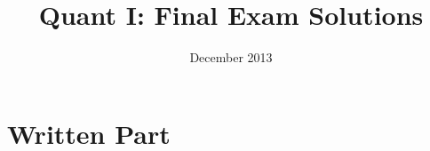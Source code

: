 \documentclass[12pt]{article}
\begin{document}
\def\sumi{\sum_{i=1}^N}
\def\yi{y_i}
\def\ybar{\bar{y}}
\def\xbar{\bar{x}}
\def\Ybar{\bar{Y}}
\def\Xbar{\bar{X}}
\def\eqc{&=&}
\def\thhat{\hat{\theta}}
\def\muhat{\hat{\mu}}
\def\expct{\mathbb{E}}
\def\hpl{\hat{p}_L}
\def\hpi{\hat{p}_I}
\def\hb0{\hat{\beta}_0}
\def\hb1{\hat{\beta}_1}
\def\sigx{\sigma_X}
\def\sigy{\sigma_Y}

\title{Quant I: Final Exam Solutions}
\date{December  2013}
\maketitle

\raggedright


\section{Written Part}
\end{document}
